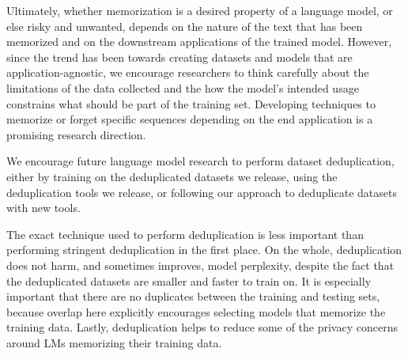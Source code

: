 Ultimately, whether memorization is a desired property of a language model, or else risky and unwanted, depends
on the nature of the text that has been memorized and on the downstream applications of the trained model.
However, since the trend has been towards creating datasets and models that are application-agnostic, we encourage researchers to think carefully about the limitations of the data
collected and the how the model's intended usage constrains what should be part of the training set. 
Developing techniques to memorize or forget specific sequences depending on the end application is a promising research direction. 

We encourage future language model research to perform dataset deduplication, either by training on the deduplicated datasets we release, using the deduplication tools we release, or following our approach to deduplicate datasets with new tools.

The exact technique used to perform deduplication is less important than performing stringent deduplication in the first place.
On the whole, deduplication does not harm, and sometimes improves, model perplexity, despite the fact that the deduplicated datasets are smaller and faster to train on.
It is especially important that there are no duplicates between the training and testing sets, because overlap here explicitly encourages selecting models that memorize the training data.
Lastly, deduplication helps to reduce some of the privacy concerns around LMs memorizing their training data.
